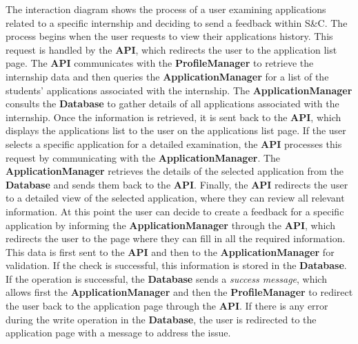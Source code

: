 \begin{enumerate}
    The interaction diagram shows the process of a user examining applications related to a specific internship and deciding to send a feedback within S\&C. The process begins when the user requests to view their applications history. This request is handled by the \textbf{API}, which redirects the user to the application list page. The \textbf{API} communicates with the \textbf{ProfileManager} to retrieve the internship data and then queries the \textbf{ApplicationManager} for a list of the students’ applications associated with the internship.
    The \textbf{ApplicationManager} consults the \textbf{Database} to gather details of all applications associated with the internship. 
    Once the information is retrieved, it is sent back to the \textbf{API}, which displays the applications list to the user on the applications list page.
    If the user selects a specific application for a detailed examination, the \textbf{API} processes this request by communicating with the \textbf{ApplicationManager}. The \textbf{ApplicationManager} retrieves the details of the selected application from the \textbf{Database} and sends them back to the \textbf{API}. 
    Finally, the \textbf{API} redirects the user to a detailed view of the selected application, where they can review all relevant information.
    At this point the user can decide to create a feedback for a specific application by informing the \textbf{ApplicationManager} through the \textbf{API}, which redirects the user to the page where they can fill in all the required information. This data is first sent to the \textbf{API} and then to the \textbf{ApplicationManager} for validation. If the check is successful, this information is stored in the \textbf{Database}. 
    If the operation is successful, the \textbf{Database} sends a \textit{success message}, which allows first the \textbf{ApplicationManager} and then the \textbf{ProfileManager} to redirect the user back to the application page through the \textbf{API}. 
    If there is any error during the write operation in the \textbf{Database}, the user is redirected to the application page with a message to address the issue.
    

\end{enumerate}
